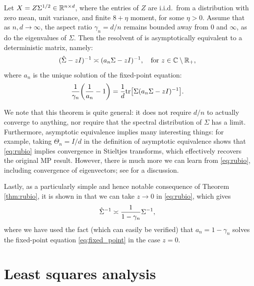 \documentclass{article}
\begin{document}
\begin{theorem}
\label{thm:rubio}
Let $X = Z \Sigma^{1/2} \in \mathbb{R}^{n \times d}$, where the entries of $Z$ are
i.i.d.\ from a distribution with zero mean, unit variance, and finite $8+\eta$ 
moment, for some $\eta>0$. Assume that as $n,d \to \infty$, the aspect ratio 
$\gamma_n = d/n$ remains bounded away from $0$ and $\infty$, as do the
eigenvalues of $\Sigma$. Then the resolvent of  is
asymptotically equivalent to a deterministic matrix, namely:
\begin{equation}
\label{eq:rubio}
(\hat\Sigma - zI)^{-1} \asymp (a_n \Sigma - zI)^{-1}, \quad \text{for $z \in \mathbb{C}  
  \setminus \mathbb{R}_+$},
\end{equation}
where $a_n$ is the unique solution of the fixed-point equation:
\begin{equation}
\label{eq:fixed_point}
\frac{1}{\gamma_n} \bigg( \frac{1}{a_n} - 1 \bigg) = \frac{1}{d} \mathrm{tr} \big[
\Sigma (a_n \Sigma - zI)^{-1} \big]. 
\end{equation}
\end{theorem}

We note that this theorem is quite general: it does not require $d/n$ to
actually converge to anything, nor require that the spectral distribution of
$\Sigma$ has a limit. Furthermore, asymptotic equivalence implies many
interesting things: for example, taking $\Theta_n = I/d$ in the definition
of asymptotic equivalence shows that \eqref{eq:rubio} implies convergence in 
Stieltjes transforms, which effectively recovers the original MP
result. However, there is much more we can learn from \eqref{eq:rubio},
including convergence of eigenvectors; see \citet{rubio2011spectral} for a
discussion.     

Lastly, as a particularly simple and hence notable consequence of Theorem
\ref{thm:rubio}, it is shown in \citet{dobriban2021distributed} that we can take
$z \to 0$ in \eqref{eq:rubio}, which gives
\begin{equation}
\label{eq:cov_deter_equiv}
\hat\Sigma^{-1} \asymp \frac{1}{1 - \gamma_n} \Sigma^{-1},
\end{equation}
where we have used the fact (which can easily be verified) that $a_n =
1-\gamma_n$ solves the fixed-point equation \eqref{eq:fixed_point} in the case 
$z=0$. 

\section{Least squares analysis}
\end{document}
